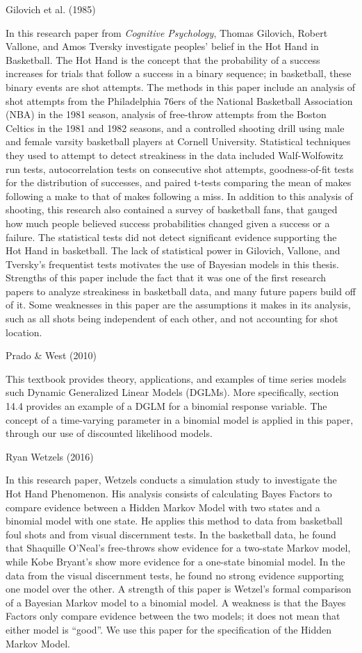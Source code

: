 \documentclass[12pt,twoside]{dukestatscithesis}
\theoremstyle{definition}
\theoremstyle{definition}
\theoremstyle{definition}
\theoremstyle{remark}
\begin{document}
Gilovich et al. (1985)

In this research paper from \emph{Cognitive Psychology}, Thomas
Gilovich, Robert Vallone, and Amos Tversky investigate peoples' belief
in the Hot Hand in Basketball. The Hot Hand is the concept that the
probability of a success increases for trials that follow a success in a
binary sequence; in basketball, these binary events are shot attempts.
The methods in this paper include an analysis of shot attempts from the
Philadelphia 76ers of the National Basketball Association (NBA) in the
1981 season, analysis of free-throw attempts from the Boston Celtics in
the 1981 and 1982 seasons, and a controlled shooting drill using male
and female varsity basketball players at Cornell University. Statistical
techniques they used to attempt to detect streakiness in the data
included Walf-Wolfowitz run tests, autocorrelation tests on consecutive
shot attempts, goodness-of-fit tests for the distribution of successes,
and paired t-tests comparing the mean of makes following a make to that
of makes following a miss. In addition to this analysis of shooting,
this research also contained a survey of basketball fans, that gauged
how much people believed success probabilities changed given a success
or a failure. The statistical tests did not detect significant evidence
supporting the Hot Hand in basketball. The lack of statistical power in
Gilovich, Vallone, and Tversky's frequentist tests motivates the use of
Bayesian models in this thesis. Strengths of this paper include the fact
that it was one of the first research papers to analyze streakiness in
basketball data, and many future papers build off of it. Some weaknesses
in this paper are the assumptions it makes in its analysis, such as all
shots being independent of each other, and not accounting for shot
location.

Prado \& West (2010)

This textbook provides theory, applications, and examples of time series
models such Dynamic Generalized Linear Models (DGLMs). More
specifically, section 14.4 provides an example of a DGLM for a binomial
response variable. The concept of a time-varying parameter in a binomial
model is applied in this paper, through our use of discounted likelihood
models.

Ryan Wetzels (2016)

In this research paper, Wetzels conducts a simulation study to
investigate the Hot Hand Phenomenon. His analysis consists of
calculating Bayes Factors to compare evidence between a Hidden Markov
Model with two states and a binomial model with one state. He applies
this method to data from basketball foul shots and from visual
discernment tests. In the basketball data, he found that Shaquille
O'Neal's free-throws show evidence for a two-state Markov model, while
Kobe Bryant's show more evidence for a one-state binomial model. In the
data from the visual discernment tests, he found no strong evidence
supporting one model over the other. A strength of this paper is
Wetzel's formal comparison of a Bayesian Markov model to a binomial
model. A weakness is that the Bayes Factors only compare evidence
between the two models; it does not mean that either model is ``good''.
We use this paper for the specification of the Hidden Markov Model.
\end{document}
